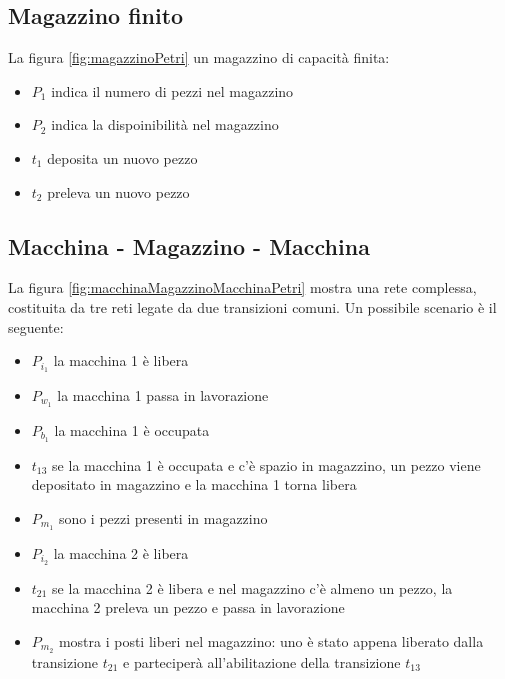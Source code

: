 \documentclass[a4paper]{report}
\begin{document}
\subsection{Magazzino finito}
La figura \ref{fig:magazzinoPetri} un magazzino di capacit\`a finita:
\begin{itemize}
\item $P_1$ indica il numero di pezzi nel magazzino
\item $P_2$ indica la dispoinibilit\`a nel magazzino
\item $t_1$ deposita un nuovo pezzo
\item $t_2$ preleva un nuovo pezzo
\end{itemize}



\subsection{Macchina - Magazzino - Macchina}

La figura \ref{fig:macchinaMagazzinoMacchinaPetri} mostra una rete
complessa, costituita da tre reti legate da due transizioni comuni. Un
possibile scenario \`e il seguente:
\begin{itemize}
\item $P_{i_1}$ la macchina 1 \`e libera
\item $P_{w_1}$ la macchina 1 passa in lavorazione
\item $P_{b_1}$ la macchina 1 \`e occupata
\item $t_{13}$ se la macchina 1 \`e occupata e c'\`e spazio in
  magazzino, un pezzo viene depositato in magazzino e la macchina 1
  torna libera
\item $P_{m_1}$ sono i pezzi presenti in magazzino
\item $P_{i_2}$ la macchina 2 \`e libera
\item $t_{21}$ se la macchina 2 \`e libera e nel magazzino c'\`e
  almeno un pezzo, la macchina 2 preleva un pezzo e passa in
  lavorazione
\item $P_{m_2}$ mostra i posti liberi nel magazzino: uno \`e stato
  appena liberato dalla transizione $t_{21}$ e parteciper\`a
  all'abilitazione della transizione $t_{13}$
\end{itemize}
\end{document}
